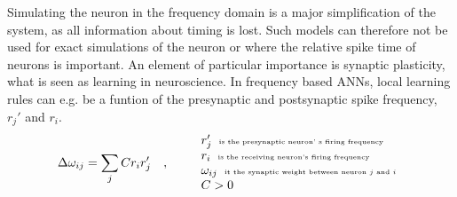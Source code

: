 
	Simulating the neuron in the frequency domain is a major simplification of the system, 
		as all information about timing is lost. %
	Such models can therefore not be used for exact simulations of the neuron or where the relative spike time of neurons is important\cite{NEVR3004OmModellane}. %
	An element of particular importance is synaptic plasticity, what is seen as learning in neuroscience\cite{CITE, NEVR3001synPlast, FDP_report}. %
	In frequency based ANNs, local learning rules can e.g. be a funtion of the presynaptic and postsynaptic spike frequency, $r_j'$ and $r_i$.
\begin{equation}
	\Delta \omega_{ij} = \sum_j C r_i r_j' \quad,\qquad
	\begin{tabular}{l}
 		$r_j'$ 			\tiny{ is the presynaptic neuron' s firing frequency} \\
		$r_i$  			\tiny{ is the receiving neuron's firing frequency}  \\
		$\omega_{ij}$ 	\tiny{ it the synaptic weight between neuron $j$ and $i$} \\ %
		$C > 0$ \\
	\end{tabular}
	\label{eqHebbsPostulate}
\end{equation}
